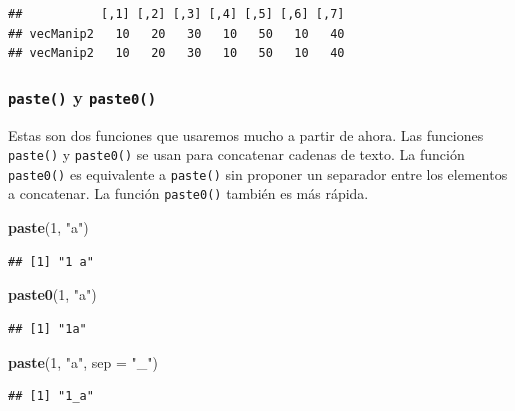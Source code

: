 \documentclass[
]{book}
\newenvironment{Shaded}{\begin{snugshade}}{\end{snugshade}}
\newcommand{\DataTypeTok}[1]{\textcolor[rgb]{0.13,0.29,0.53}{#1}}
\newcommand{\DecValTok}[1]{\textcolor[rgb]{0.00,0.00,0.81}{#1}}
\newcommand{\KeywordTok}[1]{\textcolor[rgb]{0.13,0.29,0.53}{\textbf{#1}}}
\newcommand{\NormalTok}[1]{#1}
\newcommand{\StringTok}[1]{\textcolor[rgb]{0.31,0.60,0.02}{#1}}
\begin{document}
\begin{verbatim}
##           [,1] [,2] [,3] [,4] [,5] [,6] [,7]
## vecManip2   10   20   30   10   50   10   40
## vecManip2   10   20   30   10   50   10   40
\end{verbatim}

\hypertarget{l015paste}{%
\subsubsection{\texorpdfstring{\texttt{paste()} y \texttt{paste0()}}{paste() y paste0()}}\label{l015paste}}

Estas son dos funciones que usaremos mucho a partir de ahora. Las funciones \texttt{paste()} y \texttt{paste0()} se usan para concatenar cadenas de texto. La función \texttt{paste0()} es equivalente a \texttt{paste()} sin proponer un separador entre los elementos a concatenar. La función \texttt{paste0()} también es más rápida.

\begin{Shaded}
\begin{Highlighting}[]
\KeywordTok{paste}\NormalTok{(}\DecValTok{1}\NormalTok{, }\StringTok{"a"}\NormalTok{)}
\end{Highlighting}
\end{Shaded}

\begin{verbatim}
## [1] "1 a"
\end{verbatim}

\begin{Shaded}
\begin{Highlighting}[]
\KeywordTok{paste0}\NormalTok{(}\DecValTok{1}\NormalTok{, }\StringTok{"a"}\NormalTok{)}
\end{Highlighting}
\end{Shaded}

\begin{verbatim}
## [1] "1a"
\end{verbatim}

\begin{Shaded}
\begin{Highlighting}[]
\KeywordTok{paste}\NormalTok{(}\DecValTok{1}\NormalTok{, }\StringTok{"a"}\NormalTok{, }\DataTypeTok{sep =} \StringTok{"_"}\NormalTok{)}
\end{Highlighting}
\end{Shaded}

\begin{verbatim}
## [1] "1_a"
\end{verbatim}
\end{document}
